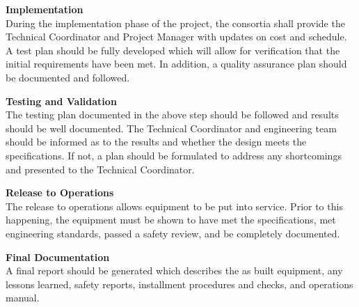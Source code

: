 {\bf Implementation}\\
During the implementation
phase of the project, the consortia shall provide the Technical
Coordinator and Project Manager with updates on cost and schedule.  A
test plan should be fully developed which will allow for verification
that the initial requirements have been met. In addition, a quality
assurance plan should be documented and followed.

{\bf Testing and Validation\\}
The testing plan documented in the above step should be followed and
results should be well documented.  The Technical Coordinator and
engineering team should be informed as to the results and whether the
design meets the specifications.  If not, a plan should be formulated
to address any shortcomings and presented to the Technical
Coordinator.

{\bf Release to Operations\\}
The release to operations allows equipment to be put into service.
Prior to this happening, the equipment must be shown to have met the
specifications, met engineering standards, passed a safety review, and
be completely documented.

{\bf Final Documentation\\}
A final report should be generated which describes the as built
equipment, any lessons learned, safety reports, installment procedures
and checks, and operations manual.
